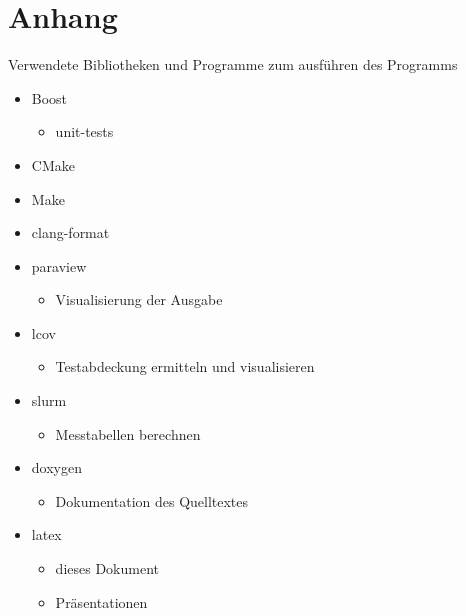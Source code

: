 \documentclass[
	12pt,
	a4paper,
	BCOR10mm,
	DIV14,
	headsepline,
]{scrreprt}
\begin{document}
\chapter{Anhang}
\label{Anhang}

Verwendete Bibliotheken und Programme zum ausführen des Programms
\begin{itemize}
	\item Boost
	\begin{itemize}
		\item unit-tests
	\end{itemize}
	\item CMake 
	\item Make
	\item clang-format
	\item paraview
	\begin{itemize}
		\item Visualisierung der Ausgabe
	\end{itemize}
	\item lcov
	\begin{itemize}
		\item Testabdeckung ermitteln und visualisieren
	\end{itemize}
	\item slurm
	\begin{itemize}
		\item Messtabellen berechnen
	\end{itemize}
	\item doxygen
	\begin{itemize}
		\item Dokumentation des Quelltextes
	\end{itemize}
	\item latex
	\begin{itemize}
		\item dieses Dokument
		\item Präsentationen
	\end{itemize}
\end{itemize}
\end{document}
